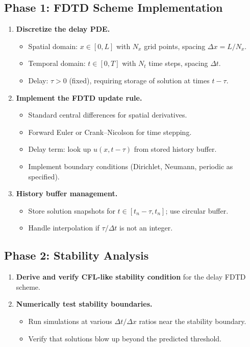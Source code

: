 \documentclass[11pt,a4paper]{article}
\begin{document}
\subsection{Phase 1: FDTD Scheme Implementation}
\begin{enumerate}[label=\textbf{1.\arabic*}]
  \item \textbf{Discretize the delay PDE.}
    \begin{itemize}
      \item Spatial domain: $x \in [0, L]$ with $N_x$ grid points, spacing $\Delta x = L / N_x$.
      \item Temporal domain: $t \in [0, T]$ with $N_t$ time steps, spacing $\Delta t$.
      \item Delay: $\tau > 0$ (fixed), requiring storage of solution at times $t - \tau$.
    \end{itemize}
  \item \textbf{Implement the FDTD update rule.}
    \begin{itemize}
      \item Standard central differences for spatial derivatives.
      \item Forward Euler or Crank--Nicolson for time stepping.
      \item Delay term: look up $u(x, t - \tau)$ from stored history buffer.
      \item Implement boundary conditions (Dirichlet, Neumann, periodic as specified).
    \end{itemize}
  \item \textbf{History buffer management.}
    \begin{itemize}
      \item Store solution snapshots for $t \in [t_n - \tau, t_n]$; use circular buffer.
      \item Handle interpolation if $\tau / \Delta t$ is not an integer.
    \end{itemize}
\end{enumerate}

\subsection{Phase 2: Stability Analysis}
\begin{enumerate}[label=\textbf{2.\arabic*}]
  \item \textbf{Derive and verify CFL-like stability condition} for the delay FDTD scheme.
  \item \textbf{Numerically test stability boundaries.}
    \begin{itemize}
      \item Run simulations at various $\Delta t / \Delta x$ ratios near the stability boundary.
      \item Verify that solutions blow up beyond the predicted threshold.
    \end{itemize}
\end{enumerate}
\end{document}
